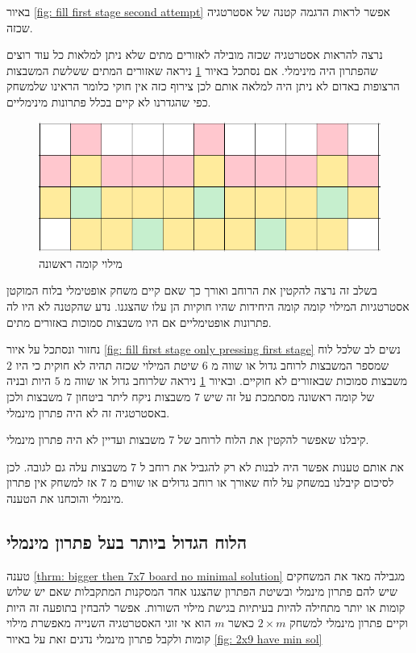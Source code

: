 \documentclass[12pt,leqno]{article}
\begin{document}
באיור 
\ref{fig: fill first stage second attempt}
אפשר לראות הדגמה קטנה של אסטרטגיה שכזה.

נרצה להראות אסטרטגיה שכזה מובילה לאזורים מתים שלא ניתן למלאות 
כל עוד רוצים שהפתרון היה מינימלי.
אם נסתכל באיור 
\ref{fig: fill first stage second attempt fails}
ניראה שאזורים המתים ששלשת
המשבצות הרצופות באדום לא ניתן היה למלאה אותם לכן צירוף כזה אין חוקי
כלומר הראינו שלמשחק כפי שהגדרנו לא קיים בכלל פתרונות מינימליים.

\begin{figure}[ht]
    \caption{מילוי קומה ראשונה}
    \label{fig: fill first stage second attempt fails}
    \centering
    \includegraphics[width=.7\textwidth,height=.7\textheight,keepaspectratio]{images/first_stage_fill_only_first_stage_click_fail.PNG}
\end{figure}

בשלב זה נרצה להקטין את הרוחב ואורך כך שאם קיים 
משחק אופטימלי בלוח המוקטן אסטרטגיות המילוי קומה קומה היחידות 
שהיו חוקיות הן עלו שהצגנו.
נדע שהקטנה לא היו לה פתרונות אופטימליים אם היו משבצות סמוכות באזורים מתים.

נחזור ונסתכל על איור 
\ref{fig: fill first stage only pressing first stage}
נשים לב שלכל לוח שמספר המשבצות לרוחב גדול או שווה 
מ
$6$
שיטת המילוי שכזה תהיה לא חוקית כי היו 
$2$
משבצות סמוכות שבאזורים לא חוקיים.
ובאיור 
\ref{fig: fill first stage second attempt fails}
ניראה
שלרוחב גדול או שווה 
מ
$5$
היות ובניה
של קומה ראשונה מסתמכת על זה שיש 
$7$
משבצות ניקח ליתר ביטחון 
$7$
משבצות ולכן באסטרטגיה זה לא היה פתרון מינמלי.

קיבלנו שאפשר להקטין את הלוח לרוחב של
$7$
משבצות 
ועדיין לא היה פתרון  מינמלי. 

את אותם טענות אפשר היה לבנות לא רק להגביל את רוחב ל
$7$
משבצות עלה גם לגובה.
לכן לסיכום קיבלנו 
במשחק על לוח 
שאורך או רוחב גדולים או שווים מ
$7$
אז
למשחק אין פתרון מינמלי
והוכחנו את הטענה.


\subsection{הלוח הגדול ביותר בעל פתרון מינמלי}
טענה 
\ref{thrm: bigger then 7x7 board no minimal solution} 
מגבילה מאד את המשחקים שיש להם פתרון מינמלי ובשיטת הפתרון שהצגנו
אחד המסקנות המתקבלות שאם יש שלוש קומות או יותר מתחילה
להיות בעיתיות בגישת מילוי השורות.
אפשר להבחין בתופעה זה היות וקיים פתרון מינמלי למשחק 
$2 \times m$
כאשר 
$m$
הוא אי זוגי
האסטרטגיה השנייה מאפשרת מילוי קומות ולקבל פתרון מינמלי
נדגים זאת על באיור 
\ref{fig: 2x9 have min sol}
\end{document}
